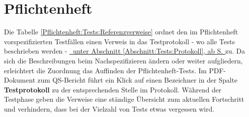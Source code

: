 %



\newpage



\section{Pflichtenheft}
\label{Abschnitt:Tests:Protokoll:Pflichtenheft-Verweise}

Die Tabelle \ref{Pflichtenheft:Tests:Referenzverweise} ordnet den im Pflichtenheft vorspezifizierten Testfällen einen Verweis in das Testprotokoll - wo alle Tests beschrieben werden - \hyperref[Abschnitt:Tests:Protokoll]{\mousecursor~unter Abschnitt \ref{Abschnitt:Tests:Protokoll}, ab S. \pageref{Abschnitt:Tests:Protokoll}} zu. Da sich die Beschreibungen beim Nachspezifizieren ändern oder weiter aufgliedern, erleichtert die Zuordnung das Auffinden der Pflichtenheft-Tests. Im PDF-Dokument zum QS-Bericht führt ein Klick auf einen Bezeichner in der Spalte \textbf{Testprotokoll}  zu der entsprechenden Stelle im Protokoll. Während  der Testphase geben die Verweise eine ständige Übersicht zum aktuellen Fortschritt und verhindern, dass bei der Vielzahl von Tests etwas vergessen wird.\\

 

